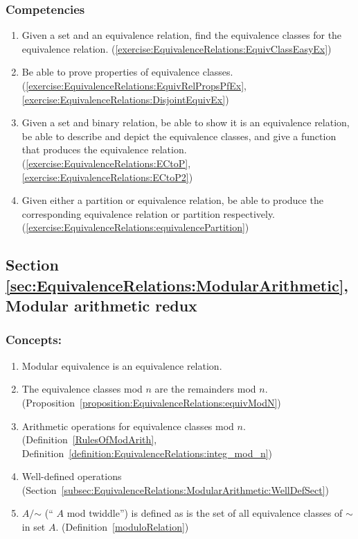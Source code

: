 \subsubsection*{Competencies}
\begin{enumerate}
\item
Given a set and an equivalence relation, find the equivalence classes for the equivalence relation.  (\ref{exercise:EquivalenceRelations:EquivClassEasyEx})
\item
Be able to prove properties of equivalence classes. (\ref{exercise:EquivalenceRelations:EquivRelPropsPfEx}, \ref{exercise:EquivalenceRelations:DisjointEquivEx})
\item
Given a set and binary relation, be able to show it is an equivalence relation,  be able to describe and depict the equivalence classes, and give a function that produces the equivalence relation. (\ref{exercise:EquivalenceRelations:ECtoP}, \ref{exercise:EquivalenceRelations:ECtoP2})
\item
Given either a partition or equivalence relation, be able to produce the corresponding equivalence relation or partition respectively. (\ref{exercise:EquivalenceRelations:equivalencePartition})
\end{enumerate}


\subsection*{Section \ref{sec:EquivalenceRelations:ModularArithmetic}, Modular arithmetic redux}
\subsubsection*{Concepts:}
\begin{enumerate}
\item 
Modular equivalence is an equivalence relation.
\item
The equivalence classes  mod $n$ are the remainders mod $n$.  (Proposition~\ref{proposition:EquivalenceRelations:equivModN})
\item
Arithmetic operations for equivalence classes mod $n$. (Definition~\ref{RulesOfModArith}, Definition~\ref{definition:EquivalenceRelations:integ_mod_n})
\item
Well-defined operations (Section~\ref{subsec:EquivalenceRelations:ModularArithmetic:WellDefSect})
\item
$A/\mathord{\sim}$ (`` $A$ mod twiddle'') is defined as is the set of all equivalence classes of $\sim$ in set $A$.  (Definition~\ref{moduloRelation})
\end{enumerate}

